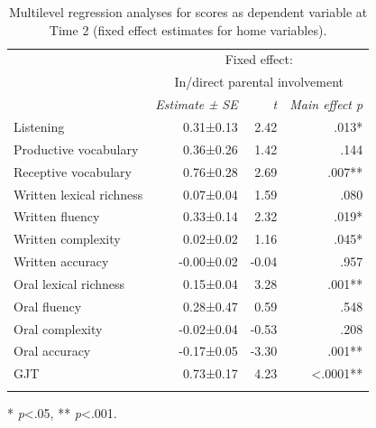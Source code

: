 \documentclass[output=paper,modfonts,nonflat,newtxmath]{langsci/langscibook}
\begin{document}
\begin{table}
	\caption{\label{tab:pfenninger:19} Multilevel regression analyses for scores as dependent variable at Time 2 (fixed effect estimates for home variables).}
	\begin{tabularx}{0.85\textwidth}{l rrr}
		\lsptoprule
		& \multicolumn{3}{c}{Fixed effect:}\\
		& \multicolumn{3}{c}{In/direct parental involvement}\\
		\cmidrule{2-4}
		& \textit{Estimate} \textit{±} \textit{SE} & \textit{t}  & \textit{Main effect p}\\
		\midrule
		Listening & 0.31±0.13 & 2.42 & .013* \\
		Productive vocabulary & 0.36±0.26 & 1.42 & .144 \\
		Receptive vocabulary & 0.76±0.28 & 2.69 & .007** \\
		Written lexical richness & 0.07±0.04 & 1.59 & .080 \\
		Written fluency & 0.33±0.14 & 2.32 & .019* \\
		Written complexity & 0.02±0.02 & 1.16 & .045* \\
		Written accuracy & -0.00±0.02 & -0.04 & .957 \\
		Oral lexical richness & 0.15±0.04 & 3.28 & .001**\\
		Oral fluency & 0.28±0.47 & 0.59 & .548 \\
		Oral complexity & -0.02±0.04 & -0.53 & .208 \\
		Oral accuracy & -0.17±0.05 & -3.30 & .001** \\
		GJT & 0.73±0.17 & 4.23 & <.0001** \\
		\lspbottomrule
	\end{tabularx}

	* \textit{p}<.05, ** \textit{p}<.001.
\end{table}


{\sloppy\printbibliography[heading=subbibliography,notkeyword=this]}
\end{document}
